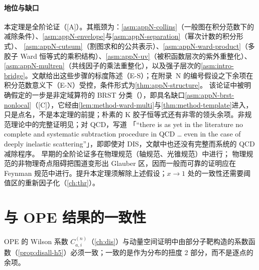 \paragraph{地位与缺口}
本定理是全阶论证（[A]）。其瓶颈为：\cref{asm:appN-collins}（一般图在积分范数下的减除条件）、\cref{asm:appN-envelope}与\cref{asm:appN-separation}（幂次计数的积分形式）、
\cref{asm:appN-cutsum}（割图求和的公共表示）、\cref{asm:appN-ward-product}（多胶子 Ward 恒等式的乘积结构）、\cref{asm:appN-uv}（被积函数层次的紫外重整化）、
\cref{asm:appN-multren}（共线因子的乘法重整化），以及强子层次的\cref{asm:intro-bridge}。文献给出这些步骤的标度陈述（E-S）；在附录~N 的编号假设之下余项在积分范数意义下（E-N）受控，条件形式为\cref{thm:appN-structure}。
该论证中被明确假定的一步是非定域算符的 BRST 分类（\cite[第~11.3.2~节，第~407--410~页]{Collins2011}），即具名缺口\cref{asm:appN-brst-nonlocal}（[C]），它经由\cref{lem:method-ward-multi}与\cref{thm:method-template}进入，
只是点名，不是本定理的前提；朴素的 K 胶子恒等式还有非零的领头余项\cite{Collins:2008sg}。非规范理论中的完整证明见\cite[第~8.9~节]{Collins2011}；对 QCD，\cite[第~10.1~节]{CollinsSoperSterman1989}写道
「“there is as yet in the literature no complete and systematic subtraction procedure in QCD \ldots{} even in the case of deeply inelastic scattering”」，即即使对 DIS，文献中也还没有完整而系统的 QCD 减除程序。
早期的全阶论证\cite{EllisEtAl1979,Ellis:1978sf,AmatiPetronzioVeneziano1978a,AmatiPetronzioVeneziano1978b,Mueller1978,CurciFurmanskiPetronzio1980}多在物理规范（轴规范、光锥规范）中进行；
物理规范的非物理奇点阻碍把围道变形出 Glauber 区，因而一般而可靠的证明应在 Feynman 规范中进行\cite[第~12.6~节]{Collins2011}。提升本定理须解除上述假设；$x\to1$ 处的一致性还需要阈值区的重新因子化（\cref{ch:thr}）。
\section{与 OPE 结果的一致性}\label{sec:disall-consistency}

OPE 的 Wilson 系数 $C^{(n)}_{a,i}$（\cref{ch:dis}）与动量空间证明中由部分子靶构造的系数函数（\cref{prop:disall-h5}）必须一致；一致的是作为分布的扭度 2 部分，而不是逐点的余项。

